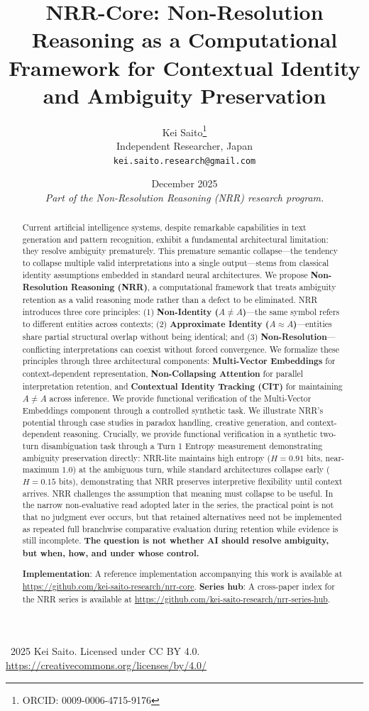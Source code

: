 \documentclass[11pt,a4paper]{article}
\title{\textbf{NRR-Core: Non-Resolution Reasoning as a Computational Framework for Contextual Identity and Ambiguity Preservation}}
\author{
  Kei Saito\thanks{ORCID: 0009-0006-4715-9176} \\
  Independent Researcher, Japan \\
  \texttt{kei.saito.research@gmail.com}
}
\date{December 2025 \\[0.5em]
\textit{Part of the Non-Resolution Reasoning (NRR) research program.}}
\begin{document}
\maketitle

\begin{center}
\textcopyright\ 2025 Kei Saito.
Licensed under CC BY 4.0.\\
\url{https://creativecommons.org/licenses/by/4.0/}
\end{center}

\begin{abstract}
Current artificial intelligence systems, despite remarkable capabilities in text generation and pattern recognition, exhibit a fundamental architectural limitation: they resolve ambiguity prematurely.
This premature semantic collapse---the tendency to collapse multiple valid interpretations into a single output---stems from classical identity assumptions embedded in standard neural architectures.
We propose \textbf{Non-Resolution Reasoning (NRR)}, a computational framework that treats ambiguity retention as a valid reasoning mode rather than a defect to be eliminated.
NRR introduces three core principles: (1) \textbf{Non-Identity ($A \neq A$)}---the same symbol refers to different entities across contexts;
(2) \textbf{Approximate Identity ($A \approx A$)}---entities share partial structural overlap without being identical;
and (3) \textbf{Non-Resolution}---conflicting interpretations can coexist without forced convergence.
We formalize these principles through three architectural components: \textbf{Multi-Vector Embeddings} for context-dependent representation, \textbf{Non-Collapsing Attention} for parallel interpretation retention, and \textbf{Contextual Identity Tracking (CIT)} for maintaining $A \neq A$ across inference.
We provide functional verification of the Multi-Vector Embeddings component through a controlled synthetic task.
We illustrate NRR's potential through case studies in paradox handling, creative generation, and context-dependent reasoning.
Crucially, we provide functional verification in a synthetic two-turn disambiguation task through a Turn 1 Entropy measurement demonstrating ambiguity preservation directly: NRR-lite maintains high entropy ($H = 0.91$ bits, near-maximum $1.0$) at the ambiguous turn, while standard architectures collapse early ($H = 0.15$ bits), demonstrating that NRR preserves interpretive flexibility until context arrives.
NRR challenges the assumption that meaning must collapse to be useful. In the narrow non-evaluative read adopted later in the series, the practical point is not that no judgment ever occurs, but that retained alternatives need not be implemented as repeated full branchwise comparative evaluation during retention while evidence is still incomplete.
\textbf{The question is not whether AI should resolve ambiguity, but when, how, and under whose control.}

\textbf{Implementation}: A reference implementation accompanying this work 
is available at \url{https://github.com/kei-saito-research/nrr-core}.
\textbf{Series hub}: A cross-paper index for the NRR series is available at
\url{https://github.com/kei-saito-research/nrr-series-hub}.
\end{abstract}
\end{document}

